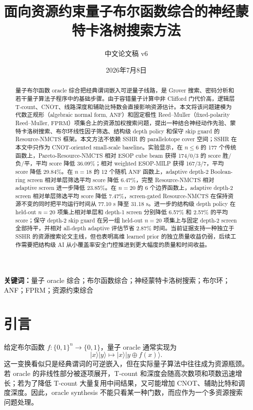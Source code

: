 \documentclass[UTF8,fontset=macnew,11pt]{ctexart}
\title{面向资源约束量子布尔函数综合的神经蒙特卡洛树搜索方法}
\author{中文论文稿 v6}
\date{2026年7月8日}
\newcommand{\method}{Resource-NMCTS}
\newcommand{\pareto}{Pareto-Resource-NMCTS}
\newcommand{\screen}{Boolean-ring screen}
\newcommand{\anf}{\ensuremath{\mathrm{ANF}}}
\newcommand{\fprm}{\ensuremath{\mathrm{FPRM}}}
\newcommand{\xor}{\ensuremath{\oplus}}
\begin{document}
\pagestyle{plain}
\maketitle

\begin{abstract}
量子布尔函数 oracle 综合把经典谓词嵌入可逆量子线路，是 Grover 搜索、密码分析和若干量子算法子程序中的基础步骤。由于容错量子计算中非 Clifford 门代价高，逻辑层 T-count、CNOT、线路深度和辅助比特数会直接影响资源估计。本文将该问题建模为代数正规形（algebraic normal form, \anf{}）和固定极性 Reed--Muller（fixed-polarity Reed--Muller, \fprm{}）项集合上的资源加权搜索问题，提出一种结合神经动作先验、蒙特卡洛树搜索、布尔环线性因子筛选、结构级 depth policy 和保守 skip guard 的 \method{} 框架。本文方法不依赖 SSHR 的 parallelotope cover 空间；SSHR 在本文中只作为 CNOT-oriented small-scale baseline。实验显示，在 $n\leq6$ 的 177 个传统函数上，\pareto{} 相对 ESOP cube beam 获得 174/0/3 的 score 胜/负/平，平均 score 降低 36.09\%；相对 weighted ESOP-MILP 获得 167/3/7，平均 score 降低 29.84\%。在 $n=18$ 的 12 个随机 \anf{} 函数上，adaptive depth-2 \screen{} 相对单层筛选平均 score 降低 6.47\%，完整 \method{} 相对 adaptive screen 进一步降低 23.85\%。在 $n=20$ 的 6 个边界函数上，adaptive depth-2 screen 相对单层筛选平均 score 降低 7.47\%，screen-gated \method{} 在保持资源不变的同时把平均运行时间从 77.10 s 降至 31.18 s。进一步的结构级 depth policy 在 held-out $n=20$ 项集上相对单层和 depth-1 screen 分别降低 6.57\% 和 2.57\% 的平均 score；保守 depth-2 skip guard 在另一组 held-out $n=20$ 项集上与固定 depth-2 screen 全部持平，并相对 all-depth adaptive 评估节省 2.87\% 时间。当前证据支持一种独立于 SSHR 的资源搜索论文主线，但也表明高维 learned prior 的独立质量收益仍弱，后续工作需要把结构级 AI 从小覆盖率安全门控推进到更大幅度的质量和时间收益。
\end{abstract}

\noindent\textbf{关键词：}量子 oracle 综合；布尔函数综合；神经蒙特卡洛树搜索；布尔环；ANF；FPRM；资源约束综合

\section{引言}

给定布尔函数 $f:\{0,1\}^n\rightarrow\{0,1\}$，量子 oracle 通常实现为
\begin{equation}
  |x\rangle |y\rangle \mapsto |x\rangle |y\xor f(x)\rangle .
  \label{eq:oracle}
\end{equation}
这一变换看似只是经典谓词的可逆嵌入，但在实际量子算法中往往成为资源瓶颈。若 oracle 的非线性部分被逐项展开，T-count 和深度会随高次数项和项数迅速增长；若为了降低 T-count 大量复用中间结果，又可能增加 CNOT、辅助比特和调度深度。因此，oracle synthesis 不能只看某一种门数，而应作为一个多资源搜索问题处理。
\end{document}
